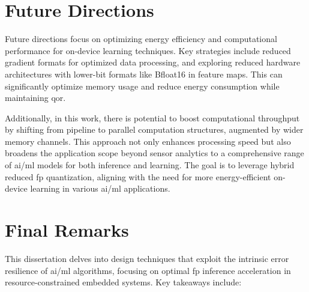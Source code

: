\section{Future Directions}

Future directions focus on optimizing energy efficiency and computational performance for on-device learning techniques. Key strategies include reduced gradient formats for optimized data processing, and exploring reduced hardware architectures with lower-bit formats like Bfloat16 in feature maps. This can significantly optimize memory usage and reduce energy consumption while maintaining \gls{qor}.

Additionally, in this work, there is potential to boost computational throughput by shifting from pipeline to parallel computation structures, augmented by wider memory channels. This approach not only enhances processing speed but also broadens the application scope beyond sensor analytics to a comprehensive range of \gls{ai}/\gls{ml} models for both inference and learning. The goal is to leverage hybrid reduced \gls{fp} quantization, aligning with the need for more energy-efficient on-device learning in various \gls{ai}/\gls{ml} applications.


\section{Final Remarks}
This dissertation delves into design techniques that exploit the intrinsic error resilience of \gls{ai}/\gls{ml} algorithms, focusing on optimal \gls{fp} inference acceleration in resource-constrained embedded systems. Key takeaways include:

